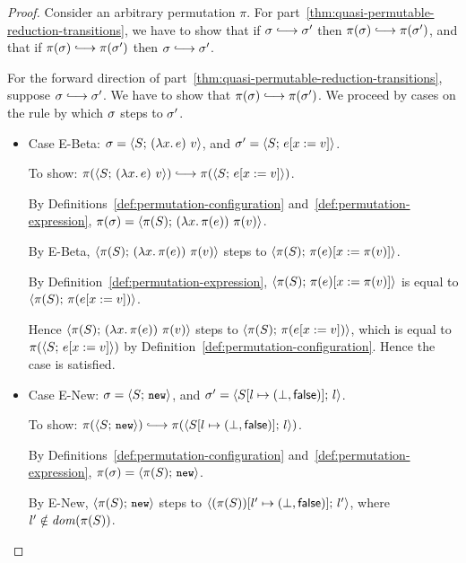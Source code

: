 \begin{proof}
  Consider an arbitrary permutation $\pi$.  For
  part~\ref{thm:quasi-permutable-reduction-transitions}, we have to
  show that if $\conf \parstepsto \conf'$ then $\pi(\conf) \parstepsto
  \pi(\conf')$, and that if $\pi(\conf) \parstepsto \pi(\conf')$ then
  $\conf \parstepsto \conf'$.

  For the forward direction of
  part~\ref{thm:quasi-permutable-reduction-transitions}, suppose
  $\conf \parstepsto \conf'$.  We have to show that $\pi(\conf)
  \parstepsto \pi(\conf')$.  We proceed by cases on the rule by which
  $\sigma$ steps to $\sigma'$.

  \begin{itemize}
    \item Case {\sc E-Beta}: $\sigma =
      \langle S;\, (\lambda x.\,e)~v \rangle$, and $\sigma' =
      \langle S;\, e[x := v] \rangle$.

      To show: $\pi(\config{S}{\app{(\lam{x}{e})}{v}}) \parstepsto
      \pi(\config{S}{\subst{e}{x}{v}})$.

      By Definitions~\ref{def:permutation-configuration}
      and~\ref{def:permutation-expression}, $\pi(\sigma) =
      \langle \pi(S);\, (\lambda x.\,\pi(e))~\pi(v) \rangle$.

      By {\sc E-Beta},
      $\langle \pi(S);\, (\lambda x.\,\pi(e))~\pi(v) \rangle$ steps to
      $\langle \pi(S);\, \pi(e)[x := \pi(v)] \rangle$.

      By Definition~\ref{def:permutation-expression},
      $\langle \pi(S);\, \pi(e)[x := \pi(v)] \rangle$ is equal to
      $\langle \pi(S);\, \pi(e[x := v]) \rangle$.

      Hence $\langle \pi(S);\, (\lambda x.\,\pi(e))~\pi(v) \rangle$ steps
      to $\langle \pi(S);\, \pi(e[x := v]) \rangle$, which is equal to
      $\pi(\langle S;\, e[x := v] \rangle)$ by
      Definition~\ref{def:permutation-configuration}.  Hence the case
      is satisfied.

    \item Case {\sc E-New}: $\sigma = \langle S;\, \mbox{\small{\texttt{new}}} \rangle$, and $\sigma' =
      \langle S[l \mapsto (\bot, \textsf{false})];\, l \rangle$.

      To show: $\pi(\config{S}{\NEW}) \parstepsto
      \pi(\config{\extS{S}{l}{\bot}{\frozenfalse}}{l})$.

      By Definitions~\ref{def:permutation-configuration}
      and~\ref{def:permutation-expression}, $\pi(\sigma) =
      \langle \pi(S);\, \mbox{\small{\texttt{new}}} \rangle$.

      By {\sc E-New}, $\langle \pi(S);\, \mbox{\small{\texttt{new}}} \rangle$ steps to
      $\langle (\pi(S))[l' \mapsto (\bot, \textsf{false})];\, l' \rangle$, where
      $l' \notin \mathit{dom}(\pi(S))$.
      

\end{itemize}
\end{proof}
